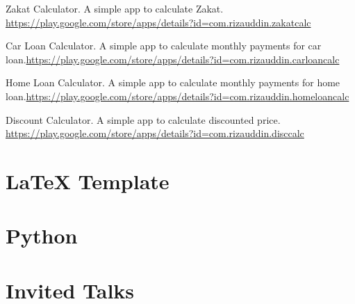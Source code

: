 \documentclass[helvetica,notitle,nobranding,nologo,totpages]{europecv}
\begin{document}
\begin{europecv}{}
{Zakat Calculator. A simple app to calculate Zakat. \url{https://play.google.com/store/apps/details?id=com.rizauddin.zakatcalc} \newline

Car Loan Calculator. A simple app to calculate monthly payments for car loan.\url{https://play.google.com/store/apps/details?id=com.rizauddin.carloancalc}
\newline

Home Loan Calculator. A simple app to calculate monthly payments for home loan.\url{https://play.google.com/store/apps/details?id=com.rizauddin.homeloancalc}
\newline

Discount Calculator. A simple app to calculate discounted price. \url{https://play.google.com/store/apps/details?id=com.rizauddin.disccalc}
\newline
}

\section{\LaTeX{} Template}

\section{Python}


\section{Invited Talks}


\end{europecv}
\end{document}
